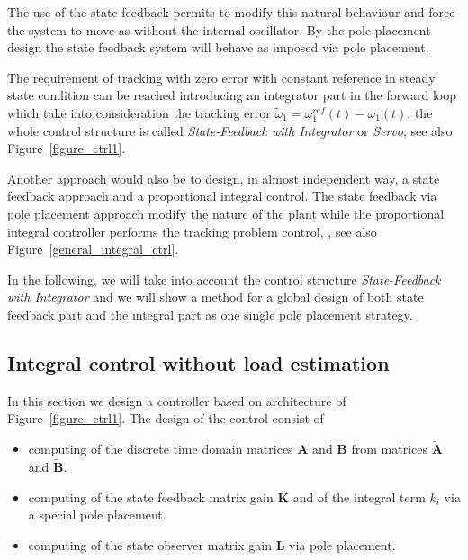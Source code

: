 \documentclass[12pt,a4paper,oneside]{book}
\begin{document}
\begin{onehalfspace}
The use of the state feedback permits to modify this natural behaviour and force the system to move as without the internal oscillator. By the pole placement design the state feedback system will behave as imposed via pole placement. 

The requirement of tracking with zero error with constant reference in steady state condition can be reached introducing an integrator part in the forward loop which take into consideration the tracking error $\tilde{\omega}_1 = \omega_1^{ref}(t)-\omega_1(t)$, the whole control structure is called \textit{State-Feedback with Integrator} or \textit{Servo}, see also Figure~\ref{figure_ctrl1}.

Another approach would also be to design, in almost independent way, a state feedback approach and a proportional integral control. The state feedback via pole placement approach modify the nature of the plant while the proportional integral controller performs the tracking problem control, , see also Figure~\ref{general_integral_ctrl}.

In the following, we will take into account the control structure 
\textit{State-Feedback with Integrator} and we will show a method for a global 
design of both state feedback part and the integral part as one single pole 
placement strategy. 

\subsection{Integral control without load estimation} 
In this section we design a controller based on architecture of Figure~\ref{figure_ctrl1}. 
The design of the control consist of
\begin{itemize}
	\item[--] computing of the discrete time domain matrices $\mathbf{A}$ and $\mathbf{B}$ from matrices $\tilde{\mathbf{A}}$ and $\tilde{\mathbf{B}}$.
	\item[--] computing of the state feedback matrix gain $\mathbf{K}$ and of the integral term $k_i$ via a special pole placement.
	\item[--] computing of the state observer matrix gain $\mathbf{L}$ via pole placement.
\end{itemize}


\end{onehalfspace}
\end{document}
